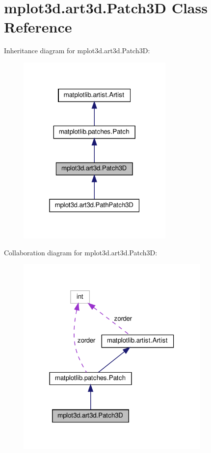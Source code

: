 \hypertarget{classmplot3d_1_1art3d_1_1Patch3D}{}\section{mplot3d.\+art3d.\+Patch3D Class Reference}
\label{classmplot3d_1_1art3d_1_1Patch3D}


Inheritance diagram for mplot3d.\+art3d.\+Patch3D\+:
\nopagebreak
\begin{figure}[H]
\begin{center}
\leavevmode
\includegraphics[width=217pt]{classmplot3d_1_1art3d_1_1Patch3D__inherit__graph}
\end{center}
\end{figure}


Collaboration diagram for mplot3d.\+art3d.\+Patch3D\+:
\nopagebreak
\begin{figure}[H]
\begin{center}
\leavevmode
\includegraphics[width=270pt]{classmplot3d_1_1art3d_1_1Patch3D__coll__graph}
\end{center}
\end{figure}

